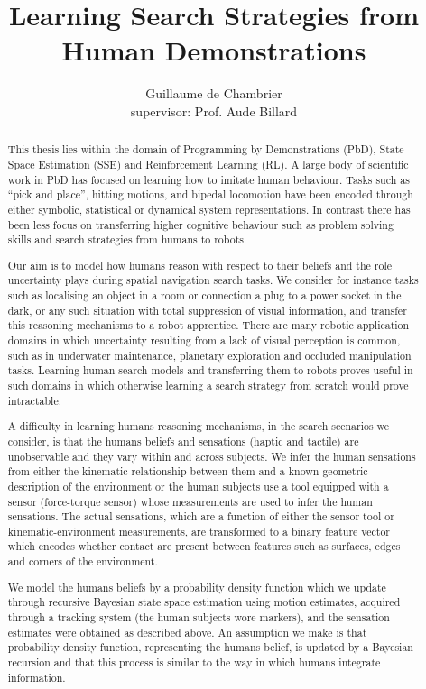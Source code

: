 \documentclass[a4paper,10pt]{article}
\title{Learning Search Strategies from Human Demonstrations}
\author[]{Guillaume de Chambrier\\supervisor: Prof. Aude Billard}
\affil[]{École Polytechnique Fédérale de Lausanne (EPFL), LASA}
\begin{document}
\maketitle

\begin{abstract}
 
This thesis lies within the domain of Programming by Demonstrations (PbD), State Space Estimation (SSE) and Reinforcement Learning (RL). 
A large body of scientific work in PbD has focused on learning how to imitate human behaviour. Tasks such as ``pick and place'', 
hitting motions, and bipedal locomotion have been encoded through either symbolic, statistical or dynamical system representations. 
In contrast there has been less focus on transferring higher cognitive behaviour such as problem solving skills and search strategies 
from humans to robots. 

Our aim is to model how humans reason with respect to their beliefs and the role uncertainty plays during spatial navigation search tasks. 
We consider for instance tasks such as localising  an object in a room or connection a plug to a power socket in the dark, 
or any such situation with total suppression of visual information, and transfer this reasoning mechanisms to a robot apprentice. 
There are many robotic application domains in which uncertainty resulting from a lack of visual perception is common, such as in underwater 
maintenance, planetary exploration and occluded manipulation tasks. Learning human search models and transferring them to robots proves useful
in such domains in which otherwise learning a search strategy from scratch would prove intractable.

A difficulty in learning humans reasoning mechanisms, in the search scenarios we consider, is that the humans 
beliefs and sensations (haptic and tactile) are unobservable and they vary within and across subjects. 
We infer the human sensations from either the kinematic relationship between them and a known geometric description of 
the environment or the human subjects use a tool equipped with a sensor (force-torque sensor) whose measurements 
are used to infer the human sensations. The actual sensations, which are a function of either the sensor tool or kinematic-environment 
measurements, are transformed to a binary feature vector which encodes whether contact are present between features such as 
surfaces, edges and corners of the environment. 

We model the humans beliefs by a probability density function which we update through recursive Bayesian 
state space estimation using motion estimates, acquired through a tracking system (the human subjects wore markers), 
and the sensation estimates were obtained as described above. An assumption we make is that probability 
density function, representing the humans belief, is updated by a Bayesian recursion 
and that this process is similar to the way in which humans integrate information.


\end{abstract}
\end{document}
